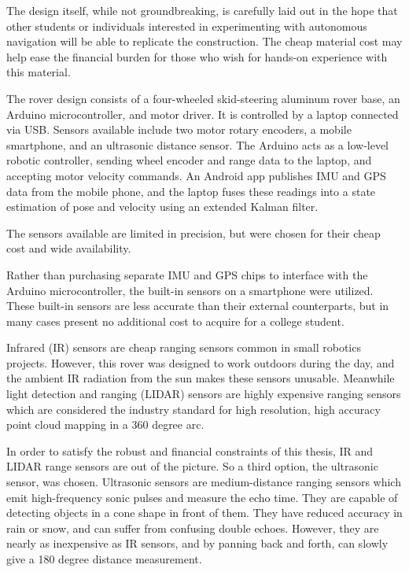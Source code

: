 The design itself, while not groundbreaking, is carefully laid out in the hope that other students or individuals interested in experimenting with autonomous navigation will be able to replicate the construction. The cheap material cost may help ease the financial burden for those who wish for hands-on experience with this material.

The rover design consists of a four-wheeled skid-steering aluminum rover base, an Arduino microcontroller, and motor driver. It is controlled by a laptop connected via USB. Sensors available include two motor rotary encoders, a mobile smartphone, and an ultrasonic distance sensor. The Arduino acts as a low-level robotic controller, sending wheel encoder and range data to the laptop, and accepting motor velocity commands. An Android app publishes IMU and GPS data from the mobile phone, and the laptop fuses these readings into a state estimation of pose and velocity using an extended Kalman filter.

The sensors available are limited in precision, but were chosen for their cheap cost and wide availability.

Rather than purchasing separate IMU and GPS chips to interface with the Arduino microcontroller, the built-in sensors on a smartphone were utilized. These built-in sensors are less accurate than their external counterparts, but in many cases present no additional cost to acquire for a college student.

Infrared (IR) sensors are cheap ranging sensors common in small robotics projects. However, this rover was designed to work outdoors during the day, and the ambient IR radiation from the sun makes these sensors unusable. Meanwhile light detection and ranging (LIDAR) sensors are highly expensive ranging sensors which are considered the industry standard for high resolution, high accuracy point cloud mapping in a 360 degree arc.

In order to satisfy the robust and financial constraints of this thesis, IR and LIDAR range sensors are out of the picture. So a third option, the ultrasonic sensor, was chosen. Ultrasonic sensors are medium-distance ranging sensors which emit high-frequency sonic pulses and measure the echo time. They are capable of detecting objects in a cone shape in front of them. They have reduced accuracy in rain or snow, and can suffer from confusing double echoes. However, they are nearly as inexpensive as IR sensors, and by panning back and forth, can slowly give a 180 degree distance measurement.

